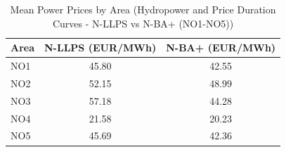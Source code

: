 \begin{table}[htbp]
\centering
\caption{Mean Power Prices by Area (Hydropower and Price Duration Curves - N-LLPS vs N-BA+ (NO1-NO5))}
\label{tab:mean_prices_NO_areas_N_LLPS_vs_N_BA_plus}
\begin{tabular}{lcc}
\hline
Area & N-LLPS (EUR/MWh) & N-BA+ (EUR/MWh) \\
\hline
NO1 & 45.80 & 42.55 \\
NO2 & 52.15 & 48.99 \\
NO3 & 57.18 & 44.28 \\
NO4 & 21.58 & 20.23 \\
NO5 & 45.69 & 42.36 \\
\hline
\end{tabular}
\end{table}